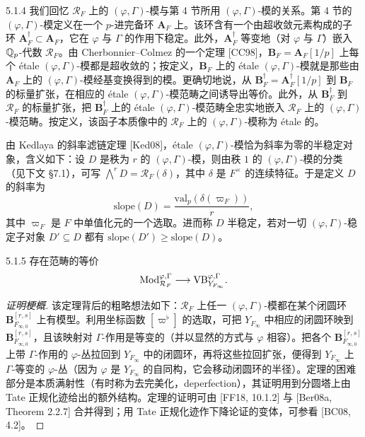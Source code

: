 \begin{rem}{5.1.4}\label{rem:a4-5-1-4}
我们回忆 $\mathcal{R}_F$ 上的 $(\varphi,\Gamma)$-模与第 4 节所用 $(\varphi,\Gamma)$-模的关系。第 4 节的 $(\varphi,\Gamma)$-模定义在一个 $p$-进完备环 $\mathbf{A}_F$ 上。该环含有一个由超收敛元素构成的子环 $\mathbf{A}^\dagger_F\subset\mathbf{A}_F$，它在 $\varphi$ 与 $\Gamma$ 的作用下稳定。此外，$\mathbf{A}^\dagger_F$ 等变地（对 $\varphi$ 与 $\Gamma$）嵌入 $\mathbb{Q}_p$-代数 $\mathcal{R}_F$。由 Cherbonnier--Colmez 的一个定理 [CC98]，$\mathbf{B}_F=\mathbf{A}_F[1/p]$ 上每个 étale $(\varphi,\Gamma)$-模都是超收敛的；按定义，$\mathbf{B}_F$ 上的 étale $(\varphi,\Gamma)$-模就是那些由 $\mathbf{A}_F$ 上的 $(\varphi,\Gamma)$-模经基变换得到的模。更确切地说，从 $\mathbf{B}^\dagger_F=\mathbf{A}^\dagger_F[1/p]$ 到 $\mathbf{B}_F$ 的标量扩张，在相应的 étale $(\varphi,\Gamma)$-模范畴之间诱导出等价。此外，从 $\mathbf{B}^\dagger_F$ 到 $\mathcal{R}_F$ 的标量扩张，把 $\mathbf{B}^\dagger_F$ 上的 étale $(\varphi,\Gamma)$-模范畴全忠实地嵌入 $\mathcal{R}_F$ 上的 $(\varphi,\Gamma)$-模范畴。按定义，该函子本质像中的 $\mathcal{R}_F$ 上的 $(\varphi,\Gamma)$-模称为 étale 的。
\end{rem}

由 Kedlaya 的斜率滤链定理 [Ked08]，étale $(\varphi,\Gamma)$-模恰为斜率为零的半稳定对象，含义如下：设 $D$ 是秩为 $r$ 的 $(\varphi,\Gamma)$-模，则由秩 $1$ 的 $(\varphi,\Gamma)$-模的分类（见下文 §7.1），可写 $\bigwedge^rD=\mathcal{R}_F(\delta)$，其中 $\delta$ 是 $F^\times$ 的连续特征。于是定义 $D$ 的斜率为
\[
\mathrm{slope}(D)=\frac{\mathrm{val}_p(\delta(\varpi_F))}{r},
\]
其中 $\varpi_F$ 是 $F$ 中单值化元的一个选取。进而称 $D$ 半稳定，若对一切 $(\varphi,\Gamma)$-稳定子对象 $D'\subseteq D$ 都有 $\mathrm{slope}(D')\ge\mathrm{slope}(D)$。

\begin{thm}{5.1.5}\label{thm:a4-5-1-5}
存在范畴的等价
\[
\operatorname{Mod}^{\varphi,\Gamma}_{\mathcal{R}_F}\longrightarrow\mathrm{VB}^{\varphi,\Gamma}_{Y_{F_\infty}}.
\]
\end{thm}

\begin{proof}[证明梗概]
该定理背后的粗略想法如下：$\mathcal{R}_F$ 上任一 $(\varphi,\Gamma)$-模都在某个闭圆环 $\mathbf{B}^{[r,s]}_{F_{\infty,0}}$ 上有模型。利用坐标函数 $[\varpi^\flat]$ 的选取，可把 $Y_{F_\infty}$ 中相应的闭圆环映到 $\mathbf{B}^{[r,s]}_{F_{\infty,0}}$，且该映射对 $\Gamma$-作用是等变的（并以显然的方式与 $\varphi$ 相容）。把各个 $\mathbf{B}^{[r,s]}_{F_{\infty,0}}$ 上带 $\Gamma$-作用的 $\varphi$-丛拉回到 $Y_{F_\infty}$ 中的闭圆环，再将这些拉回扩张，便得到 $Y_{F_\infty}$ 上 $\Gamma$-等变的 $\varphi$-丛（因为 $\varphi$ 是 $Y_{F_\infty}$ 的自同构，它会移动闭圆环的半径）。定理的困难部分是本质满射性（有时称为去完美化，deperfection），其证明用到分圆塔上由 Tate 正规化迹给出的额外结构。定理的证明可由 [FF18, 10.1.2] 与 [Ber08a, Theorem 2.2.7] 合并得到；用 Tate 正规化迹作下降论证的变体，可参看 [BC08, 4.2]。
\end{proof}

